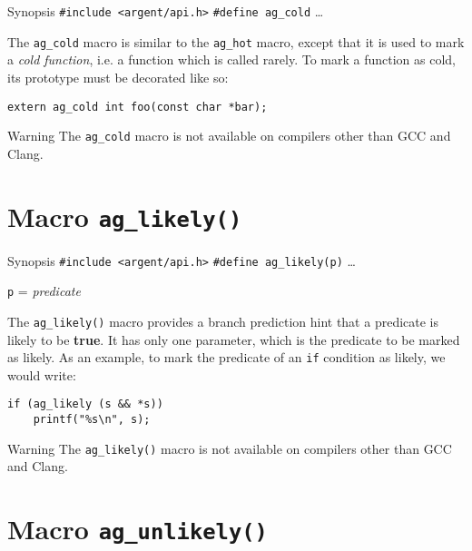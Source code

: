 \begin{bclogo}[logo=\bccrayon, noborder=true, barre=snake, couleurBarre=gray]
    {Synopsis}
  \verb|#include <argent/api.h>|
  \verb|#define ag_cold| \ldots
\end{bclogo}

The \verb|ag_cold| macro is similar to the \verb|ag_hot| macro, except
that it is used to mark a \emph{cold function}, i.e. a function which is called
rarely. To mark a function as cold, its prototype must be decorated like so:
\begin{lstlisting}[linewidth=1.0\linewidth]
extern ag_cold int foo(const char *bar);
\end{lstlisting}

\begin{bclogo}[logo=\bctakecare, noborder=true, couleurBarre=orange]{Warning}
  The \verb|ag_cold| macro is not available on compilers other than GCC and 
  Clang.
\end{bclogo}


\section{Macro \texttt{ag\_likely()}}

\begin{bclogo}[logo=\bccrayon, noborder=true, barre=snake, couleurBarre=gray]
    {Synopsis}
  \verb|#include <argent/api.h>|
  \verb|#define ag_likely(p)| \ldots
  \par
  \texttt{p} = \emph{predicate}
\end{bclogo}

The \verb|ag_likely()| macro provides a branch prediction hint that a predicate
is likely to be \textbf{true}. It has only one parameter, which is the predicate 
to be marked as likely. As an example, to mark the predicate of an \verb|if| 
condition as likely, we would write:
\begin{lstlisting}[linewidth=1.0\linewidth]
if (ag_likely (s && *s)) 
    printf("%s\n", s);
\end{lstlisting}

\begin{bclogo}[logo=\bctakecare, noborder=true, couleurBarre=orange]{Warning}
  The \verb|ag_likely()| macro is not available on compilers other than GCC and 
  Clang.
\end{bclogo}


\section{Macro \texttt{ag\_unlikely()}}

